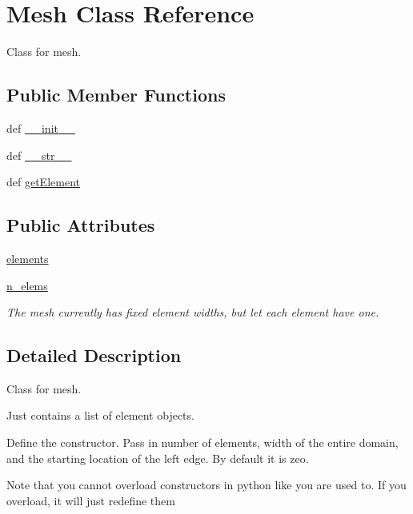 \hypertarget{classsrc_1_1_mesh_1_1_mesh}{\section{Mesh Class Reference}
\label{classsrc_1_1_mesh_1_1_mesh}
}


Class for mesh.  


\subsection*{Public Member Functions}
\begin{DoxyCompactItemize}
\item 
def \hyperlink{classsrc_1_1_mesh_1_1_mesh_ac775ee34451fdfa742b318538164070e}{\-\_\-\-\_\-init\-\_\-\-\_\-}
\item 
def \hyperlink{classsrc_1_1_mesh_1_1_mesh_aa7a4b9bc0941308e362738503137460e}{\-\_\-\-\_\-str\-\_\-\-\_\-}
\item 
def \hyperlink{classsrc_1_1_mesh_1_1_mesh_ae1fb639aa4d03c92c77dfdfab0ee2740}{get\-Element}
\end{DoxyCompactItemize}
\subsection*{Public Attributes}
\begin{DoxyCompactItemize}
\item 
\hyperlink{classsrc_1_1_mesh_1_1_mesh_aa9aaa650bacb9b91c82437c2ce48f50c}{elements}
\item 
\hyperlink{classsrc_1_1_mesh_1_1_mesh_ac31c5f98a6c4c5374dc0de3dad36e81e}{n\-\_\-elems}
\begin{DoxyCompactList}\small\item\em The mesh currently has fixed element widths, but let each element have one. \end{DoxyCompactList}\end{DoxyCompactItemize}


\subsection{Detailed Description}
Class for mesh. 

Just contains a list of element objects. \begin{DoxyVerb}Define the constructor. Pass in number of elements, width of the entire
domain, and the starting location of the left edge.  By default it is zeo. 

Note that you cannot overload constructors in python
like you are used to. If you overload, it will just redefine them\end{DoxyVerb}
 

